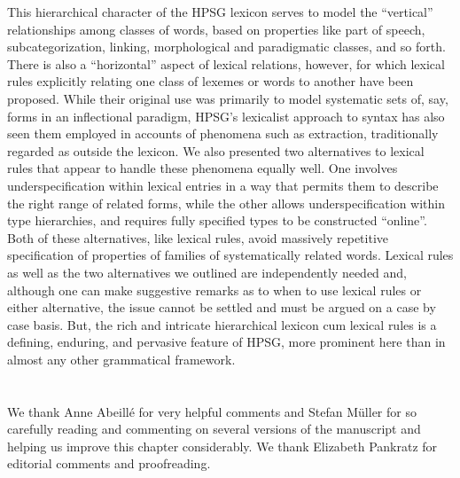 \documentclass[output=paper
 	        ,biblatex
                ,babelshorthands
                ,newtxmath
                ,draftmode
                ,colorlinks, citecolor=brown
]{langscibook}
\begin{document}
This hierarchical character of the HPSG lexicon serves to model the ``vertical'' relationships among classes of words, based on properties like part of speech, subcategorization, linking, morphological and paradigmatic classes, and so forth.
There is also a ``horizontal'' aspect of lexical relations, however, for which lexical rules explicitly relating one class of lexemes or words to another have been proposed.
While their original use was primarily to model systematic sets of, say, forms in an inflectional paradigm, HPSG's lexicalist approach to syntax has also seen them employed in accounts of phenomena such as extraction, traditionally regarded as outside the lexicon.
We also presented two alternatives to lexical rules that appear to handle these phenomena equally well.
One involves underspecification within lexical entries in a way that permits them to describe the right range of related forms, while the other allows underspecification within type hierarchies, and requires fully specified types to be constructed ``online''.
Both of these alternatives, like lexical rules, avoid massively repetitive specification of properties of families of systematically related words. Lexical rules as well as the two alternatives we outlined are independently needed and, although one can make suggestive remarks as to when to use lexical rules or either alternative, the issue cannot be settled  and must be argued on a case by case basis. But, the rich and intricate hierarchical lexicon cum lexical rules is a defining, enduring, and pervasive feature of HPSG, more prominent here than in almost any other grammatical framework.




 
\section*{\acknowledgmentsUS}

We thank Anne Abeillé for very helpful comments and Stefan Müller for so carefully reading and commenting on several versions of the manuscript  and helping us improve this chapter considerably. We thank Elizabeth Pankratz for editorial comments and proofreading.

{\sloppy
\printbibliography[heading=subbibliography,notkeyword=this] 
}
\end{document}
